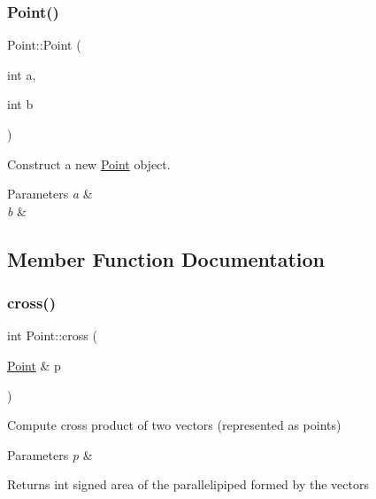 \subsubsection{\texorpdfstring{Point()}{Point()}\hspace{0.1cm}{\footnotesize\ttfamily [2/2]}}
{\footnotesize\ttfamily Point\+::\+Point (\begin{DoxyParamCaption}\item[{int}]{a,  }\item[{int}]{b }\end{DoxyParamCaption})\hspace{0.3cm}{\ttfamily [inline]}}



Construct a new \mbox{\hyperlink{classPoint}{Point}} object. 


\begin{DoxyParams}{Parameters}
{\em a} & \\
\hline
{\em b} & \\
\hline
\end{DoxyParams}


\subsection{Member Function Documentation}
\mbox{\label{classPoint_adcccafffe2054603d2c7bfe949a3675b}} 
\subsubsection{\texorpdfstring{cross()}{cross()}}
{\footnotesize\ttfamily int Point\+::cross (\begin{DoxyParamCaption}\item[{\mbox{\hyperlink{classPoint}{Point}} \&}]{p }\end{DoxyParamCaption})\hspace{0.3cm}{\ttfamily [inline]}}



Compute cross product of two vectors (represented as points) 


\begin{DoxyParams}{Parameters}
{\em p} & \\
\hline
\end{DoxyParams}
\begin{DoxyReturn}{Returns}
int signed area of the parallelipiped formed by the vectors 
\end{DoxyReturn}
\mbox{\label{classPoint_a9d0a9f62ffc7345f802085706101cd62}} 
